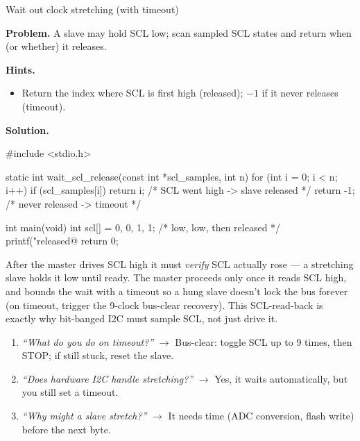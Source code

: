 \begin{gymproblem}{Wait out clock stretching (with timeout)}

\textbf{Problem.} A slave may hold SCL low; scan sampled SCL states and return
when (or whether) it releases.

\textbf{Hints.}
\begin{itemize}
\item Return the index where SCL is first high (released); $-1$ if it never
  releases (timeout).
\end{itemize}

\attempt

\textbf{Solution.}
\begin{cgym}
#include <stdio.h>

static int wait_scl_release(const int *scl_samples, int n) {
    for (int i = 0; i < n; i++)
        if (scl_samples[i]) return i;     /* SCL went high -> slave released */
    return -1;                            /* never released -> timeout */
}

int main(void) {
    int scl[] = {0, 0, 1, 1};             /* low, low, then released */
    printf("released@%
    return 0;
}
\end{cgym}

After the master drives SCL high it must \emph{verify} SCL actually rose ---
a stretching slave holds it low until ready. The master proceeds only once it
reads SCL high, and bounds the wait with a timeout so a hung slave doesn't lock
the bus forever (on timeout, trigger the 9-clock bus-clear recovery). This
SCL-read-back is exactly why bit-banged I2C must sample SCL, not just drive it.

\followups
\begin{enumerate}
\item \emph{``What do you do on timeout?''} $\rightarrow$ Bus-clear: toggle SCL
  up to 9 times, then STOP; if still stuck, reset the slave.
\item \emph{``Does hardware I2C handle stretching?''} $\rightarrow$ Yes, it
  waits automatically, but you still set a timeout.
\item \emph{``Why might a slave stretch?''} $\rightarrow$ It needs time (ADC
  conversion, flash write) before the next byte.
\end{enumerate}
\end{gymproblem}

